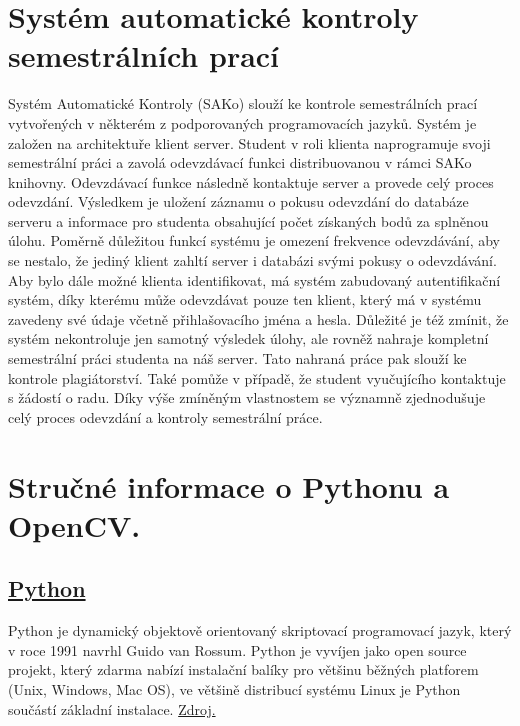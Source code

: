 \documentclass[12pt, a4paper]{article}
\begin{document}
\section{Systém automatické kontroly semestrálních prací}
\label{sec:SAKo}
\par{Systém Automatické Kontroly (SAKo) slouží ke kontrole semestrálních prací vytvořených v některém z podporovaných programovacích jazyků. Systém je založen na architektuře klient server. Student v roli klienta naprogramuje svoji semestrální práci a zavolá odevzdávací funkci distribuovanou v rámci SAKo knihovny. Odevzdávací funkce následně kontaktuje server a provede celý proces odevzdání. Výsledkem je uložení záznamu o pokusu odevzdání do databáze serveru a informace pro studenta obsahující počet získaných bodů za splněnou úlohu. Poměrně důležitou funkcí systému je omezení frekvence odevzdávání, aby se nestalo, že jediný klient zahltí server i databázi svými pokusy o odevzdávání. Aby bylo dále možné klienta identifikovat, má systém zabudovaný autentifikační systém, díky kterému může odevzdávat pouze ten klient, který má v systému zavedeny své údaje včetně přihlašovacího jména a hesla. Důležité je též zmínit, že systém nekontroluje jen samotný výsledek úlohy, ale rovněž nahraje kompletní semestrální práci studenta na náš server. Tato nahraná práce pak slouží ke kontrole plagiátorství. Také pomůže v případě, že student vyučujícího kontaktuje s žádostí o radu. Díky výše zmíněným vlastnostem se významně zjednodušuje celý proces odevzdání a kontroly semestrální práce.}












\section{Stručné informace o Pythonu a OpenCV.}

\subsection*{\href{https://www.python.org/}{Python}}
\par{Python je dynamický objektově orientovaný skriptovací programovací jazyk, který v roce 1991 navrhl Guido van Rossum. Python je vyvíjen jako open source projekt, který zdarma nabízí instalační balíky pro většinu běžných platforem (Unix, Windows, Mac OS), ve většině distribucí systému Linux je Python součástí základní instalace. \href{http://en.wikipedia.org/wiki/Python_(programming_language)}{Zdroj.}}
\end{document}
